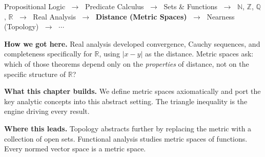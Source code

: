
\begin{tcolorbox}[
  colback=gray!6,
  colframe=gray!40,
  arc=2pt,
  left=8pt, right=8pt, top=6pt, bottom=6pt,
  title={\small\textbf{Where You Are in the Journey}},
  fonttitle=\small\bfseries
]
\begin{center}
\small
Propositional Logic
$\;\to\;$ Predicate Calculus
$\;\to\;$ Sets \& Functions
$\;\to\;$ $\mathbb{N}$, $\mathbb{Z}$, $\mathbb{Q}$, $\mathbb{R}$
$\;\to\;$ Real Analysis
$\;\to\;$ \textbf{Distance (Metric Spaces)}
$\;\to\;$ Nearness (Topology)
$\;\to\;$ $\cdots$
\end{center}

\medskip
\noindent\textbf{How we got here.}
Real analysis developed convergence, Cauchy sequences, and completeness
specifically for $\mathbb{R}$, using $|x - y|$ as the distance.
Metric spaces ask: which of those theorems depend only on the
\emph{properties} of distance, not on the specific structure of $\mathbb{R}$?

\medskip
\noindent\textbf{What this chapter builds.}
We define metric spaces axiomatically and port the key analytic
concepts into this abstract setting.
The triangle inequality is the engine driving every result.

\medskip
\noindent\textbf{Where this leads.}
Topology abstracts further by replacing the metric with a collection
of open sets. Functional analysis studies metric spaces of functions.
Every normed vector space is a metric space.
\end{tcolorbox}
\vspace{1em}

